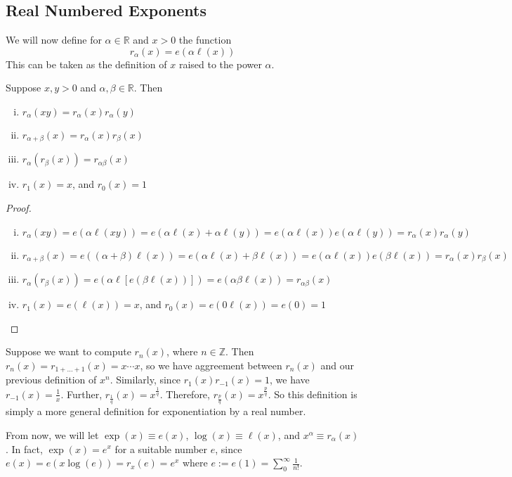 \documentclass{article}
\begin{document}
\subsection{Real Numbered Exponents}
We will now define for $\alpha \in \mathbb R$ and $x > 0$ the function
\[ r_\alpha(x) = e(\alpha \ell(x)) \]
This can be taken as the definition of $x$ raised to the power $\alpha$.
\begin{theorem}
	Suppose $x, y > 0$ and $\alpha, \beta \in \mathbb R$. Then
	\begin{enumerate}[(i)]
		\item $r_\alpha(xy) = r_\alpha(x)r_\alpha(y)$
		\item $r_{\alpha + \beta}(x) = r_\alpha(x) r_\beta(x)$
		\item $r_\alpha(r_\beta(x)) = r_{\alpha\beta}(x)$
		\item $r_1(x) = x$, and $r_0(x) = 1$
	\end{enumerate}
\end{theorem}
\begin{proof}
	\begin{enumerate}[(i)]
		\item $r_\alpha(xy) = e(\alpha \ell(xy)) = e(\alpha \ell(x) + \alpha \ell(y)) = e(\alpha \ell(x))e(\alpha\ell(y)) = r_\alpha(x)r_\alpha(y)$
		\item $r_{\alpha + \beta}(x) = e((\alpha + \beta) \ell(x)) = e(\alpha\ell(x) + \beta\ell(x)) = e(\alpha\ell(x))e(\beta\ell(x)) = r_\alpha(x) r_\beta(x)$
		\item $r_\alpha(r_\beta(x)) = e(\alpha \ell[e(\beta \ell(x))]) = e(\alpha \beta \ell(x)) = r_{\alpha\beta}(x)$
		\item $r_1(x) = e(\ell(x)) = x$, and $r_0(x) = e(0 \ell(x)) = e(0) = 1$
	\end{enumerate}
\end{proof}
\noindent Suppose we want to compute $r_n(x)$, where $n \in\mathbb Z$. Then $r_n(x) = r_{1 + \dots + 1}(x) = x \cdots x$, so we have aggreement between $r_n(x)$ and our previous definition of $x^n$. Similarly, since $r_1(x) r_{-1}(x) = 1$, we have $r_{-1}(x) = \frac{1}{x}$. Further, $r_{\frac{1}{q}}(x) = x^\frac{1}{q}$. Therefore, $r_{\frac{p}{q}}(x) = x^{\frac{p}{q}}$. So this definition is simply a more general definition for exponentiation by a real number.

From now, we will let $\exp(x) \equiv e(x)$, $\log(x) \equiv \ell(x)$, and $x^\alpha \equiv r_\alpha(x)$. In fact, $\exp(x) = e^x$ for a suitable number $e$, since $e(x) = e(x \log(e)) = r_x(e) = e^x$ where $e := e(1) = \sum_0^\infty \frac{1}{n!}$.
\end{document}
